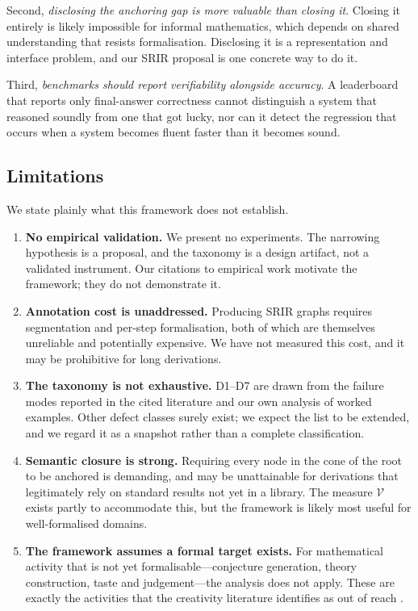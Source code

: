\documentclass[11pt,a4paper]{article}
\theoremstyle{definition}
\theoremstyle{plain}
\theoremstyle{remark}
\newcommand{\V}{\mathcal{V}}           %
\begin{document}
Second, \emph{disclosing the anchoring gap is more valuable than closing it}.
Closing it entirely is likely impossible for informal mathematics, which
depends on shared understanding that resists formalisation. Disclosing it is a
representation and interface problem, and our SRIR proposal is one concrete way
to do it.

Third, \emph{benchmarks should report verifiability alongside accuracy}. A
leaderboard that reports only final-answer correctness cannot distinguish a
system that reasoned soundly from one that got lucky, nor can it detect the
regression that occurs when a system becomes fluent faster than it becomes
sound.

\subsection{Limitations}
\label{sec:boundary}

We state plainly what this framework does not establish.

\begin{enumerate}
  \item \textbf{No empirical validation.} We present no experiments. The
        narrowing hypothesis is a proposal, and the taxonomy is a design
        artifact, not a validated instrument. Our citations to empirical work
        motivate the framework; they do not demonstrate it.
  \item \textbf{Annotation cost is unaddressed.} Producing SRIR graphs requires
        segmentation and per-step formalisation, both of which are themselves
        unreliable and potentially expensive. We have not measured this cost,
        and it may be prohibitive for long derivations.
  \item \textbf{The taxonomy is not exhaustive.} D1--D7 are drawn from the
        failure modes reported in the cited literature and our own analysis of
        worked examples. Other defect classes surely exist; we expect the list
        to be extended, and we regard it as a snapshot rather than a complete
        classification.
  \item \textbf{Semantic closure is strong.} Requiring every node in the cone of
        the root to be anchored is demanding, and may be unattainable for
        derivations that legitimately rely on standard results not yet in a
        library. The measure $\V$ exists partly to accommodate this, but the
        framework is likely most useful for well-formalised domains.
  \item \textbf{The framework assumes a formal target exists.} For mathematical
        activity that is not yet formalisable---conjecture generation,
        theory construction, taste and judgement---the analysis does not apply.
        These are exactly the activities that the creativity literature
        identifies as out of reach \cite{chen2025deepmath}.
\end{enumerate}
\end{document}
